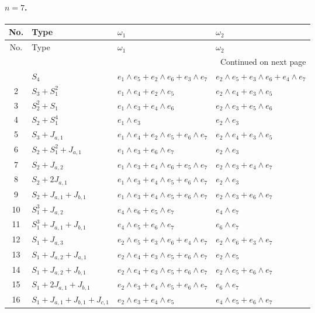 \paragraph{$n=7$.}
\begin{longtable}{@{}c p{} p{} p{}@{}}
\toprule
No. & Type & $\omega_1$ & $\omega_2$ \\
\midrule
\endfirsthead
\toprule
No. & Type & $\omega_1$ & $\omega_2$ \\
\midrule
\endhead
\midrule
\multicolumn{4}{r}{Continued on next page}\\
\midrule
\endfoot
\bottomrule
\endlastfoot
1 & \(S_4\) & $e_{1} \wedge e_{5} + e_{2} \wedge e_{6} + e_{3} \wedge e_{7}$ & $e_{2} \wedge e_{5} + e_{3} \wedge e_{6} + e_{4} \wedge e_{7}$ \\
2 & \(S_3 + S_1^2\) & $e_{1} \wedge e_{4} + e_{2} \wedge e_{5}$ & $e_{2} \wedge e_{4} + e_{3} \wedge e_{5}$ \\
3 & \(S_2^2 + S_1\) & $e_{1} \wedge e_{3} + e_{4} \wedge e_{6}$ & $e_{2} \wedge e_{3} + e_{5} \wedge e_{6}$ \\
4 & \(S_2 + S_1^4\) & $e_{1} \wedge e_{3}$ & $e_{2} \wedge e_{3}$ \\
5 & \(S_3 + J_{a,1}\) & $e_{1} \wedge e_{4} + e_{2} \wedge e_{5} + e_{6} \wedge e_{7}$ & $e_{2} \wedge e_{4} + e_{3} \wedge e_{5}$ \\
6 & \(S_2 + S_1^2 + J_{a,1}\) & $e_{1} \wedge e_{3} + e_{6} \wedge e_{7}$ & $e_{2} \wedge e_{3}$ \\
7 & \(S_2 + J_{a,2}\) & $e_{1} \wedge e_{3} + e_{4} \wedge e_{6} + e_{5} \wedge e_{7}$ & $e_{2} \wedge e_{3} + e_{4} \wedge e_{7}$ \\
8 & \(S_2 + 2J_{a,1}\) & $e_{1} \wedge e_{3} + e_{4} \wedge e_{5} + e_{6} \wedge e_{7}$ & $e_{2} \wedge e_{3}$ \\
9 & \(S_2 + J_{a,1} + J_{b,1}\) & $e_{1} \wedge e_{3} + e_{4} \wedge e_{5} + e_{6} \wedge e_{7}$ & $e_{2} \wedge e_{3} + e_{6} \wedge e_{7}$ \\
10 & \(S_1^3 + J_{a,2}\) & $e_{4} \wedge e_{6} + e_{5} \wedge e_{7}$ & $e_{4} \wedge e_{7}$ \\
11 & \(S_1^3 + J_{a,1} + J_{b,1}\) & $e_{4} \wedge e_{5} + e_{6} \wedge e_{7}$ & $e_{6} \wedge e_{7}$ \\
12 & \(S_1 + J_{a,3}\) & $e_{2} \wedge e_{5} + e_{3} \wedge e_{6} + e_{4} \wedge e_{7}$ & $e_{2} \wedge e_{6} + e_{3} \wedge e_{7}$ \\
13 & \(S_1 + J_{a,2} + J_{a,1}\) & $e_{2} \wedge e_{4} + e_{3} \wedge e_{5} + e_{6} \wedge e_{7}$ & $e_{2} \wedge e_{5}$ \\
14 & \(S_1 + J_{a,2} + J_{b,1}\) & $e_{2} \wedge e_{4} + e_{3} \wedge e_{5} + e_{6} \wedge e_{7}$ & $e_{2} \wedge e_{5} + e_{6} \wedge e_{7}$ \\
15 & \(S_1 + 2J_{a,1} + J_{b,1}\) & $e_{2} \wedge e_{3} + e_{4} \wedge e_{5} + e_{6} \wedge e_{7}$ & $e_{6} \wedge e_{7}$ \\
16 & \(S_1 + J_{a,1} + J_{b,1} + J_{c,1}\) & $e_{2} \wedge e_{3} + e_{4} \wedge e_{5}$ & $e_{4} \wedge e_{5} + e_{6} \wedge e_{7}$ \\
\end{longtable}
